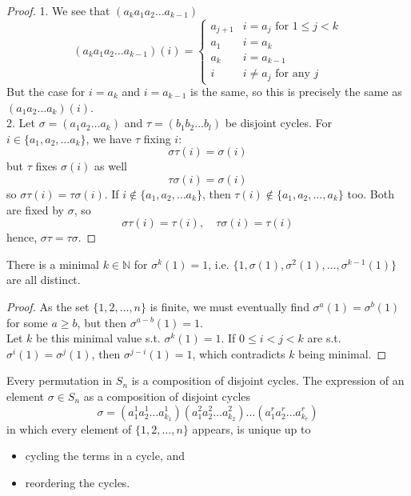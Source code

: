 \documentclass[a4paper]{article}
\begin{document}
\begin{proof}
1. We see that $(a_ka_1a_2\dots a_{k-1})$
$$(a_ka_1a_2\dots a_{k-1})(i)=
\left\{
        \begin{array}{ll}
      a_{j+1} & i=a_j\text{ for }1\leq j<k \\
      a_1 & i=a_k\\
      a_k & i=a_{k-1}\\
      i & i\neq a_j\text{ for any }j
        \end{array}
    \right.$$
But the case for $i=a_k$ and $i=a_{k-1}$ is the same, so this is precisely the same as $(a_1a_2\dots a_k)(i)$.\\[5pt]
2. Let $\sigma=(a_1a_2\dots a_k)$ and $\tau=(b_1b_2\dots b_l)$ be disjoint cycles. For $i\in\{a_1,a_2,\dots a_k\}$, we have $\tau$ fixing $i$:
$$\sigma\tau(i)=\sigma(i)$$
but $\tau$ fixes $\sigma(i)$ as well
$$\tau\sigma(i)=\sigma(i)$$
so $\sigma\tau(i)=\tau\sigma(i)$. If $i\notin\{a_1,a_2,\dots a_k\}$, then $\tau(i)\notin\{a_1,a_2,\dots,a_k\}$ too. Both are fixed by $\sigma$, so
$$\sigma\tau(i)=\tau(i),\quad \tau\sigma(i)=\tau(i)$$
hence, $\sigma\tau=\tau\sigma$.
\end{proof}
\begin{lemma}
There is a minimal $k\in\mathbb{N}$ for $\sigma^k(1)=1$, i.e. $\{1,\sigma(1),\sigma^2(1),\dots,\sigma^{k-1}(1)\}$ are all distinct.
\end{lemma}
\begin{proof}
As the set $\{1,2,\dots,n\}$ is finite, we must eventually find $\sigma^a(1)=\sigma^b(1)$ for some $a\geq b$, but then $\sigma^{a-b}(1)=1$.\\[5pt]
Let $k$ be this minimal value s.t. $\sigma^k(1)=1$. If $0\leq i<j<k$ are s.t. $\sigma^i(1)=\sigma^j(1)$, then $\sigma^{j-i}(1)=1$, which contradicts $k$ being minimal.
\end{proof}
\begin{thm}
Every permutation in $S_n$ is a composition of disjoint cycles. The expression of an element $\sigma\in S_n$ as a composition of disjoint cycles
$$\sigma=(a_1^1a_2^1\dots a_{k_1}^1)(a_1^2a_2^2\dots a_{k_2}^2)\dots(a_1^ra_2^r\dots a_{k_r}^r)$$
in which every element of $\{1,2,\dots,n\}$ appears, is unique up to
\begin{itemize}
    \item cycling the terms in a cycle, and
    \item reordering the cycles.
\end{itemize}
\end{thm}
\end{document}

